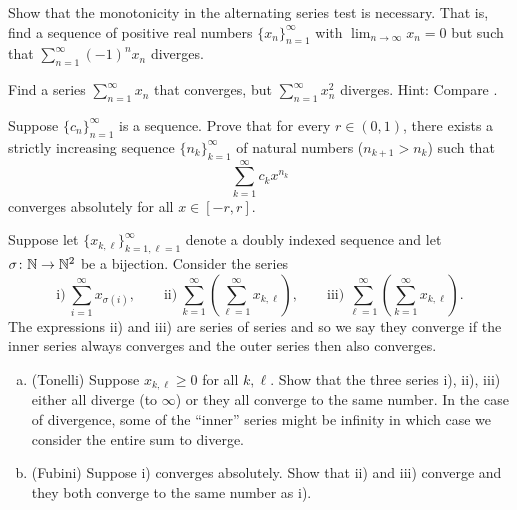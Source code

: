 \begin{exercise}[Challenging]
Show that the monotonicity in the alternating series test
is necessary.  That is, find a sequence of positive real numbers
$\{ x_n \}_{n=1}^\infty$ with $\lim_{n\to\infty} x_n = 0$ but such that
$\sum_{n=1}^\infty {(-1)}^n x_n$ diverges.
\end{exercise}

\begin{exercise}
Find a series
$\sum_{n=1}^\infty x_n$ that converges,
but $\sum_{n=1}^\infty x_n^2$ diverges.
Hint: Compare .
\end{exercise}

\begin{exercise}
Suppose $\{ c_n \}_{n=1}^\infty$ is a sequence.  Prove that for every $r \in (0,1)$,
there exists a strictly increasing sequence $\{ n_k \}_{k=1}^\infty$ of natural numbers
($n_{k+1} > n_k$) such that
\begin{equation*}
\sum_{k=1}^\infty c_k x^{n_k}
\end{equation*}
converges absolutely for all $x \in [-r,r]$.
\end{exercise}

\begin{exercise}
\label{exercise:tonellifubiniforsums}%
%
Suppose let $\{ x_{k,\ell} \}_{k=1,\ell=1}^\infty$ denote a doubly
indexed sequence and let $\sigma \colon {\mathbb{N}} \to {\mathbb{N}}^2$ be a bijection.
Consider the series
\begin{equation*}
\text{i)}~\sum_{i=1}^\infty x_{\sigma(i)},
\qquad
\text{ii)}~\sum_{k=1}^\infty \left( \sum_{\ell=1}^\infty x_{k,\ell} \right),
\qquad
\text{iii)}~\sum_{\ell=1}^\infty \left( \sum_{k=1}^\infty x_{k,\ell} \right) .
\end{equation*}
The expressions ii) and iii) are series of series and so we say they converge
if the inner series always converges and the outer series then also
converges.
\begin{enumerate}[a)]
\item
(Tonelli) Suppose $x_{k,\ell} \geq 0$ for all $k,\ell$.
Show that the three series i), ii), iii) either all diverge (to $\infty$)
or they all converge to the same number.
In the case of divergence, some of the ``inner'' series might be infinity
in which case we consider the entire sum to diverge.
\item
(Fubini) Suppose i) converges absolutely.  Show that ii) and iii)
converge and they both converge to the same number as i).
\end{enumerate}
\end{exercise}
